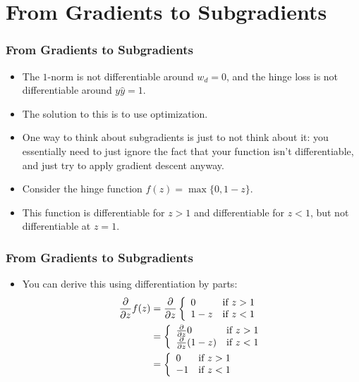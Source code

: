 \documentclass[trans]{beamer}
\begin{document}
\section{From Gradients to Subgradients}
\begin{frame}
  \frametitle{From Gradients to Subgradients}
\begin{itemize}
\item The $1$-norm is not differentiable around
$w_d=0$, and the hinge loss is not differentiable around $y\hat y=1$.
\item 
The solution to this is to use  optimization.
\item One way to think about subgradients is just to not think about it: you
essentially need to just ignore the fact that  your
function isn't differentiable, and just try to apply gradient descent
anyway.
\item 
Consider the hinge function $f(z) =
\max\{0,1-z\}$. 
\item  This
function is differentiable for $z>1$ and differentiable for $z<1$, but
not differentiable at $z=1$. 
\end{itemize}
\end{frame}

\begin{frame}
  \frametitle{From Gradients to Subgradients}
\begin{itemize}
\item 
 You can derive this using
differentiation by parts:
%
\begin{align}
  \frac \partial {\partial z} f(z)
  &= \frac \partial {\partial z} \left\{\begin{array}{ll} 0 & \text{if } z > 1 \\ 1-z & \text{if } z < 1\end{array}\right. \\
  &= \left\{\begin{array}{ll} \frac \partial {\partial z} 0 & \text{if } z > 1 \\ \frac \partial {\partial z} (1-z) & \text{if } z < 1\end{array}\right.\\
  &= \left\{\begin{array}{ll} 0 & \text{if } z > 1 \\ -1 & \text{if } z < 1\end{array}\right.
\end{align}
%
\end{itemize}
\end{frame}
\end{document}
